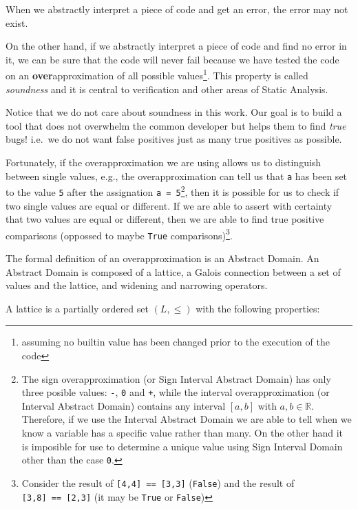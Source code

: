 \documentclass[
11pt, %
english, %
singlespacing, %
headsepline, %
]{MastersDoctoralThesis} %
\begin{document}
When we abstractly interpret a piece of code and get an error, the error
may not exist.

On the other hand, if we abstractly interpret a piece of code and find
no error in it, we can be sure that the code will never fail because we
have tested the code on an \textbf{over}approximation of all possible
values\footnote{assuming no builtin value has been changed prior to the
  execution of the code}. This property is called \emph{soundness} and
it is central to verification and other areas of Static Analysis.

Notice that we do not care about soundness in this work. Our goal is to
build a tool that does not overwhelm the common developer but helps them
to find \emph{true} bugs! i.e.~we do not want false positives just as
many true positives as possible.

Fortunately, if the overapproximation we are using allows us to
distinguish between single values, e.g., the overapproximation can tell
us that \texttt{a} has been set to the value \texttt{5} after the
assignation \texttt{a\ =\ 5}\footnote{The sign overapproximation (or
  Sign Interval Abstract Domain) has only three posible values:
  \texttt{-}, \texttt{0} and \texttt{+}, while the interval
  overapproximation (or Interval Abstract Domain) contains any interval
  \([a,b]\) with \(a,b \in \mathbb{R}\). Therefore, if we use the
  Interval Abstract Domain we are able to tell when we know a variable
  has a specific value rather than many. On the other hand it is
  imposible for use to determine a unique value using Sign Interval
  Domain other than the case \texttt{0}.}, then it is possible for us to
check if two single values are equal or different. If we are able to
assert with certainty that two values are equal or different, then we
are able to find true positive comparisons (oppossed to maybe
\texttt{True} comparisons)\footnote{Consider the result of
  \texttt{{[}4,4{]}\ ==\ {[}3,3{]}} (\texttt{False}) and the result of
  \texttt{{[}3,8{]}\ ==\ {[}2,3{]}} (it may be \texttt{True} or
  \texttt{False})}.

The formal definition of an overapproximation is an Abstract Domain. An
Abstract Domain is composed of a lattice, a Galois connection between a
set of values and the lattice, and widening and narrowing operators.

A lattice is a partially ordered set \((L, \le)\) with the following
properties:
\end{document}

